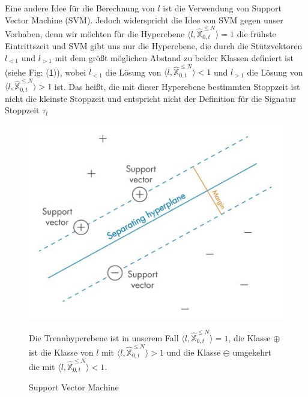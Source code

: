 \documentclass[12pt,titlepage,headsepline]{article}
\begin{document}
      \hfill\break
      Eine andere Idee für die Berechnung von $l$ ist die Verwendung von Support Vector Machine (SVM). Jedoch widerspricht die Idee von SVM gegen unser Vorhaben, denn wir möchten für die Hyperebene $\langle l,\hat{\mathbb{X}}^{\leq N}_{0,t}\rangle = 1$ die frühste Eintrittszeit und SVM gibt uns nur die Hyperebene, die durch die Stützvektoren $l_{<1}$ und $l_{>1}$ mit dem größt möglichen Abstand zu beider Klassen definiert ist (siehe Fig: (\ref{support_vector_machine})), wobei $l_{<1}$ die Lösung von $\langle l,\hat{\mathbb{X}}^{\leq N}_{0,t}\rangle < 1$ und $l_{>1}$ die Lösung von
      $\langle l,\hat{\mathbb{X}}^{\leq N}_{0,t}\rangle > 1$ ist. Das heißt, die mit dieser Hyperebene bestimmten Stoppzeit ist nicht die kleinste Stoppzeit und entspricht nicht der Definition für die Signatur Stoppzeit $\tau_l$
      \begin{figure}[H]
        \caption[support_vector_machine]{Support Vector Machine}
        \centering
        \includegraphics[scale=.6]{support_vector_machine_matlab.jpg}

        {\footnotesize
        Die Trennhyperebene ist in unserem Fall $\langle l,\hat{\mathbb{X}}^{\leq N}_{0,t}\rangle = 1$, die Klasse $\oplus$ ist die Klasse von $l$ mit $\langle l,\hat{\mathbb{X}}^{\leq N}_{0,t}\rangle > 1$ und die Klasse $\ominus$ umgekehrt die mit $\langle l,\hat{\mathbb{X}}^{\leq N}_{0,t}\rangle < 1$.
        \par}
        \label{support_vector_machine}
      \end{figure}
      \newpage
\end{document}
